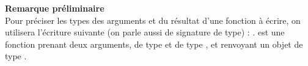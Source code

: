 
\vspace{-3cm}

\textbf{Remarque préliminaire} \\
Pour préciser les types des arguments et du résultat d’une fonction à écrire, on utilisera l’écriture suivante (on parle aussi de signature de type) :
.  est une fonction prenant deux arguments,  de
type  et  de type , et renvoyant un objet de type .







